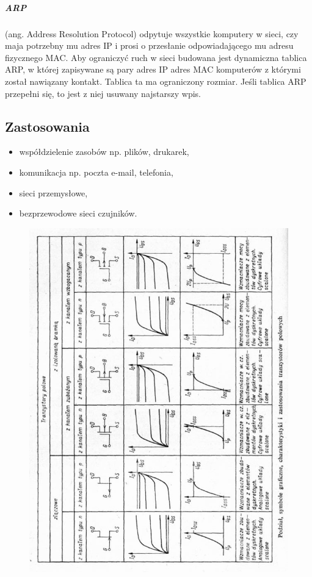 \documentclass[a4paper,twoside]{report}
\begin{document}
\subparagraph{ARP} (ang. Address Resolution Protocol) odpytuje wszystkie komputery w sieci, czy maja potrzebny mu adres IP i prosi o przesłanie odpowiadającego mu adresu fizycznego MAC. Aby ograniczyć ruch w sieci budowana jest dynamiczna tablica ARP, w której zapisywane są pary adres IP adres MAC komputerów z którymi został nawiązany kontakt. Tablica ta ma ograniczony rozmiar. Jeśli tablica ARP przepełni się, to jest z niej usuwany najstarszy wpis.

\subsection{Zastosowania}
\medskip 
\begin{itemize}
\item współdzielenie zasobów np. plików, drukarek,
\item komunikacja np. poczta e-mail, telefonia,
\item sieci przemysłowe,
\item bezprzewodowe sieci czujników.
\end{itemize}


\begin{figure}[htbp]
\centering
\includegraphics[width=\linewidth]{obrazy/tranzystory/ch-ki_polowe.jpg} 
\end{figure}
\end{document}

